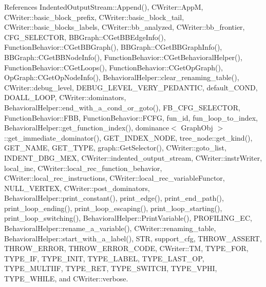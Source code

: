 References Indented\+Output\+Stream\+::\+Append(), C\+Writer\+::\+AppM, C\+Writer\+::basic\+\_\+block\+\_\+prefix, C\+Writer\+::basic\+\_\+block\+\_\+tail, C\+Writer\+::basic\+\_\+blocks\+\_\+labels, C\+Writer\+::bb\+\_\+analyzed, C\+Writer\+::bb\+\_\+frontier, C\+F\+G\+\_\+\+S\+E\+L\+E\+C\+T\+OR, B\+B\+Graph\+::\+C\+Get\+B\+B\+Edge\+Info(), Function\+Behavior\+::\+C\+Get\+B\+B\+Graph(), B\+B\+Graph\+::\+C\+Get\+B\+B\+Graph\+Info(), B\+B\+Graph\+::\+C\+Get\+B\+B\+Node\+Info(), Function\+Behavior\+::\+C\+Get\+Behavioral\+Helper(), Function\+Behavior\+::\+C\+Get\+Loops(), Function\+Behavior\+::\+C\+Get\+Op\+Graph(), Op\+Graph\+::\+C\+Get\+Op\+Node\+Info(), Behavioral\+Helper\+::clear\+\_\+renaming\+\_\+table(), C\+Writer\+::debug\+\_\+level, D\+E\+B\+U\+G\+\_\+\+L\+E\+V\+E\+L\+\_\+\+V\+E\+R\+Y\+\_\+\+P\+E\+D\+A\+N\+T\+IC, default\+\_\+\+C\+O\+ND, D\+O\+A\+L\+L\+\_\+\+L\+O\+OP, C\+Writer\+::dominators, Behavioral\+Helper\+::end\+\_\+with\+\_\+a\+\_\+cond\+\_\+or\+\_\+goto(), F\+B\+\_\+\+C\+F\+G\+\_\+\+S\+E\+L\+E\+C\+T\+OR, Function\+Behavior\+::\+F\+BB, Function\+Behavior\+::\+F\+C\+FG, fun\+\_\+id, fun\+\_\+loop\+\_\+to\+\_\+index, Behavioral\+Helper\+::get\+\_\+function\+\_\+index(), dominance$<$ Graph\+Obj $>$\+::get\+\_\+immediate\+\_\+dominator(), G\+E\+T\+\_\+\+I\+N\+D\+E\+X\+\_\+\+N\+O\+DE, tree\+\_\+node\+::get\+\_\+kind(), G\+E\+T\+\_\+\+N\+A\+ME, G\+E\+T\+\_\+\+T\+Y\+PE, graph\+::\+Get\+Selector(), C\+Writer\+::goto\+\_\+list, I\+N\+D\+E\+N\+T\+\_\+\+D\+B\+G\+\_\+\+M\+EX, C\+Writer\+::indented\+\_\+output\+\_\+stream, C\+Writer\+::instr\+Writer, local\+\_\+inc, C\+Writer\+::local\+\_\+rec\+\_\+function\+\_\+behavior, C\+Writer\+::local\+\_\+rec\+\_\+instructions, C\+Writer\+::local\+\_\+rec\+\_\+variable\+Functor, N\+U\+L\+L\+\_\+\+V\+E\+R\+T\+EX, C\+Writer\+::post\+\_\+dominators, Behavioral\+Helper\+::print\+\_\+constant(), print\+\_\+edge(), print\+\_\+end\+\_\+path(), print\+\_\+loop\+\_\+ending(), print\+\_\+loop\+\_\+escaping(), print\+\_\+loop\+\_\+starting(), print\+\_\+loop\+\_\+switching(), Behavioral\+Helper\+::\+Print\+Variable(), P\+R\+O\+F\+I\+L\+I\+N\+G\+\_\+\+EC, Behavioral\+Helper\+::rename\+\_\+a\+\_\+variable(), C\+Writer\+::renaming\+\_\+table, Behavioral\+Helper\+::start\+\_\+with\+\_\+a\+\_\+label(), S\+TR, support\+\_\+cfg, T\+H\+R\+O\+W\+\_\+\+A\+S\+S\+E\+RT, T\+H\+R\+O\+W\+\_\+\+E\+R\+R\+OR, T\+H\+R\+O\+W\+\_\+\+E\+R\+R\+O\+R\+\_\+\+C\+O\+DE, C\+Writer\+::\+TM, T\+Y\+P\+E\+\_\+\+F\+OR, T\+Y\+P\+E\+\_\+\+IF, T\+Y\+P\+E\+\_\+\+I\+N\+IT, T\+Y\+P\+E\+\_\+\+L\+A\+B\+EL, T\+Y\+P\+E\+\_\+\+L\+A\+S\+T\+\_\+\+OP, T\+Y\+P\+E\+\_\+\+M\+U\+L\+T\+I\+IF, T\+Y\+P\+E\+\_\+\+R\+ET, T\+Y\+P\+E\+\_\+\+S\+W\+I\+T\+CH, T\+Y\+P\+E\+\_\+\+V\+P\+HI, T\+Y\+P\+E\+\_\+\+W\+H\+I\+LE, and C\+Writer\+::verbose.



